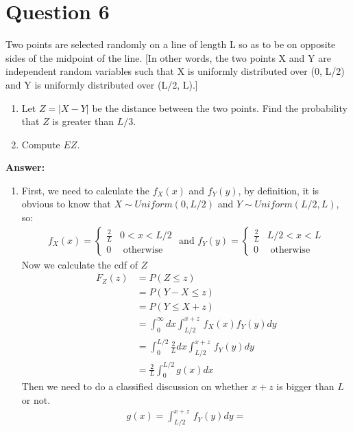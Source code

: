 \documentclass[hidelinks]{article}
\begin{document}
\section{Question 6}
Two points are selected randomly on a line of length L so as to be on opposite sides
of the midpoint of the line. [In other words, the two points X and Y are independent
random variables such that X is uniformly distributed over (0, L/2) and Y is uniformly
distributed over (L/2, L).]
\begin{enumerate}
    \item Let $Z = |X - Y|$ be the distance between the two points. Find the probability that $Z$ is greater than $L/3$.
    \item Compute $EZ$.
\end{enumerate}
\textbf{Answer:}\\
\begin{enumerate}
    \item First, we need to calculate the $f_X(x)$ and $f_Y(y)$, by definition, it is obvious to know that $X \sim Uniform(0,L/2)$ and $Y \sim Uniform(L/2,L)$, so:
    \begin{align*}
        f_X(x) = 
        \begin{cases}
            \frac{2}{L} & 0 < x < L/2 \\
            0 & \text{ otherwise }
        \end{cases}
        \text{  and  }
        f_Y(y) = 
        \begin{cases}
            \frac{2}{L} & L/2 < x < L \\
            0 & \text{ otherwise }
        \end{cases}
    \end{align*}
    Now we calculate the cdf of $Z$
    \begin{align*}
        F_Z(z)  &= P(Z \leq z) \\
                &= P(Y - X \leq z) \\
                &= P(Y \leq X+z) \\
                &= \int^\infty_{0}dx \int^{x+z}_{L/2} \, f_X(x)f_Y(y)dy \\
                &= \int^{L/2}_{0} \frac{2}{L} dx \int^{x+z}_{L/2} \, f_Y(y)dy \\
                &=  \frac{2}{L}\int^{L/2}_{0} g(x) dx
    \end{align*}
    Then we need to do a classified discussion on whether $x+z$ is bigger than $L$ or not.
    \begin{align*}
        g(x) = \int^{x+z}_{L/2} \, f_Y(y)dy = 

\end{align*}
\end{enumerate}
\end{document}
